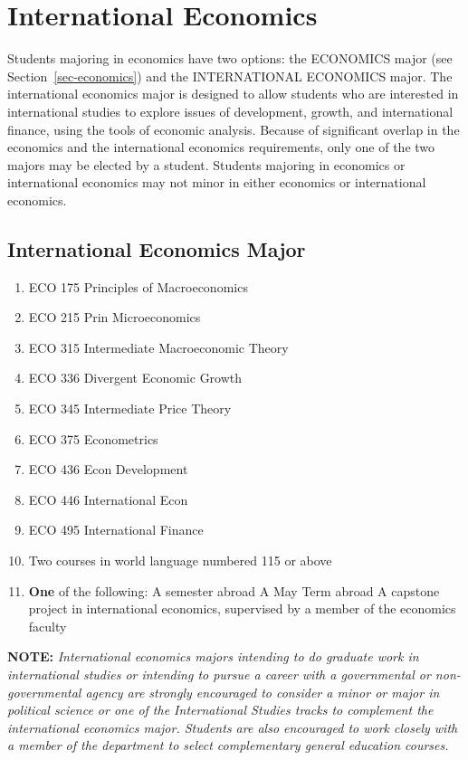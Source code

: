 \documentclass[
  letterpaper,
]{scrbook}
\providecommand{\tightlist}{%
  \setlength{\itemsep}{0pt}\setlength{\parskip}{0pt}}
\begin{document}
\section{International Economics}\label{sec-international-economics}

Students majoring in economics have two options: the ECONOMICS major
(see Section~\ref{sec-economics}) and the INTERNATIONAL ECONOMICS major.
The international economics major is designed to allow students who are
interested in international studies to explore issues of development,
growth, and international finance, using the tools of economic analysis.
Because of significant overlap in the economics and the international
economics requirements, only one of the two majors may be elected by a
student. Students majoring in economics or international economics may
not minor in either economics or international economics.

\subsection{International Economics
Major}\label{international-economics-major}

\begin{enumerate}
\def\labelenumi{\arabic{enumi}.}
\tightlist
\item
  ECO 175 Principles of Macroeconomics
\item
  ECO 215 Prin Microeconomics
\item
  ECO 315 Intermediate Macroeconomic Theory
\item
  ECO 336 Divergent Economic Growth
\item
  ECO 345 Intermediate Price Theory
\item
  ECO 375 Econometrics
\item
  ECO 436 Econ Development
\item
  ECO 446 International Econ
\item
  ECO 495 International Finance
\item
  Two courses in world language numbered 115 or above
\item
  \textbf{One} of the following: A semester abroad A May Term abroad A
  capstone project in international economics, supervised by a member of
  the economics faculty
\end{enumerate}

\textbf{NOTE:} \emph{International economics majors intending to do
graduate work in international studies or intending to pursue a career
with a governmental or non-governmental agency are strongly encouraged
to consider a minor or major in political science or one of the
International Studies tracks to complement the international economics
major. Students are also encouraged to work closely with a member of the
department to select complementary general education courses. }
\end{document}
